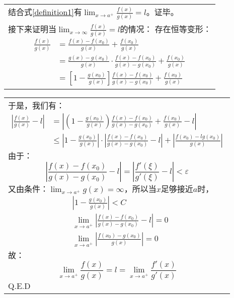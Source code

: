 \documentclass{ctexart}
\begin{document}
\begin{tabular}{p{}}
        结合式\eqref{definition1}有$\lim_{x\rightarrow a^+}\frac{f(x)}{g(x)} = l$。证毕。 \\
        接下来证明当$\lim_{x\rightarrow\infty}\frac{f(x)}{g(x)} = l$的情况：
        存在恒等变形：
        \begin{equation}
            \begin{aligned}
                \frac{f(x)}{g(x)} &= \frac{f(x) - f(x_0)}{g(x)} + \frac{f(x_0)}{g(x)}\\
                &= \frac{g(x) - g(x_0)}{g(x)}\cdot\frac{f(x) - f(x_0)}{g(x) - g(x_0)}
                + \frac{f(x_0)}{g(x)}\\
                &= \left[ 1 - \frac{g(x_0)}{g(x)} \right]\frac{f(x) - f(x_0)}{g(x) - g(x_0)}
                + \frac{f(x_0)}{g(x)}
            \end{aligned}
            \label{equation7}
        \end{equation}
    \end{tabular}
    \newpage
    \begin{tabular}{p{}}
        于是，我们有：
        \begin{equation}
            \begin{aligned}
                \left| \frac{f(x)}{g(x)} - l \right| &=
                \left| \left( 1 - \frac{g(x_0)}{g(x)} \right)
                \frac{f(x) - f(x_0)}{g(x) - g(x_0)} + \frac{f(x_0)}{g(x)} - l \right|\\
                &\leqslant \left| 1 - \frac{g(x_0)}{g(x)} \right|\cdot
                \left| \frac{f(x) - f(x_0)}{g(x) - g(x_0)} - l \right|
                + \left| \frac{f(x_0) - lg(x_0)}{g(x)} \right|
            \end{aligned}
            \label{equation8}
        \end{equation}
        由于：
        \begin{equation}
            \left| \frac{f(x) - f(x_0)}{g(x) - g(x_0)} - l \right|
            = \left| \frac{f'(\xi)}{g'(\xi)} - l \right| < \varepsilon
            \label{equation9}
        \end{equation}
        又由条件：$\lim_{x\rightarrow a^+}g(x) = \infty$，所以当$x$足够接近$a$时，
        \begin{equation}
            \begin{aligned}
                &\left| 1 - \frac{g(x_0)}{g(x)} \right| < C\\
                &\lim_{x\rightarrow a^+}\left|
                \frac{f(x) - f(x_0)}{g(x) - g(x_0)} - l \right| = 0\\
                &\lim_{x\rightarrow a^+}\left| \frac{f(x_0) - g(x_0)}{g(x)} \right| = 0
            \end{aligned}
            \label{equation10}
        \end{equation}
        故：
        \begin{equation}
            \lim_{x\rightarrow a^+}\frac{f(x)}{g(x)} = l =
            \lim_{x\rightarrow a^+}\frac{f'(x)}{g'(x)}
            \label{equation11}
        \end{equation}
        Q.E.D
    \end{tabular}
\end{document}
